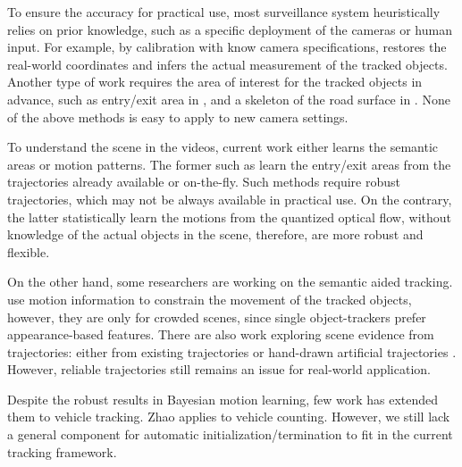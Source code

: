 
\label{sec:semantic-related}
To ensure the accuracy for practical use, most surveillance system heuristically relies on prior knowledge, such as a specific deployment of the cameras or human input. For example, by calibration with know camera specifications, \cite{cheng2011intelligent,corral2017slot} restores the real-world coordinates and infers the actual measurement of the tracked objects. Another type of work requires the area of interest for the tracked objects in advance, such as entry/exit area in \cite{tamersoy2009robust,rodriguez2010adaptive,mishra2013video}, and a skeleton of the road surface in \cite{bas2007automatic}. None of the above methods is easy to apply to new camera settings.

To understand the scene in the videos, current work either learns the semantic areas or motion patterns. The former such as \cite{tung2011goal,nedrich2013detecting,yang2012multi} learn the entry/exit areas from the trajectories already available or on-the-fly. Such methods require robust trajectories, which may not be always available in practical use.
On the contrary, the latter \cite{wang2009unsupervised,kuettel2010s,hospedales2009markov,liao2015video} statistically learn the motions from the quantized optical flow, without knowledge of the actual objects in the scene, therefore, are more robust and flexible. 

On the other hand, some researchers are working on the semantic aided tracking. \cite{zhao2012tracking,kratz2010tracking} use motion information to constrain the movement of the tracked objects, however, they are only for crowded scenes, since single object-trackers prefer appearance-based features.
There are also work exploring scene evidence from trajectories: either from existing trajectories \cite{song2010online} or hand-drawn artificial trajectories \cite{manen2014appearances}. However, reliable trajectories still remains an issue for real-world application.

Despite the robust results in Bayesian motion learning, few work has extended them to vehicle tracking.
Zhao \etc \cite{zhao2013counting} applies \cite{wang2009unsupervised} to vehicle counting. However, we still lack a general component for automatic initialization/termination to fit in the current tracking framework.
